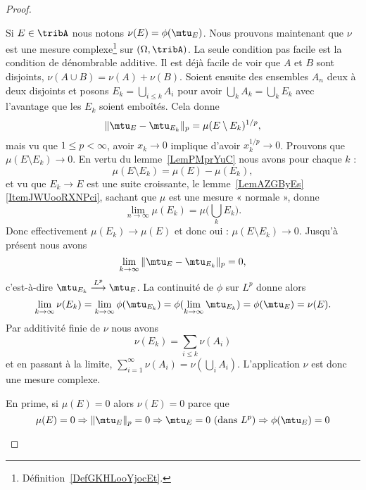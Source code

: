 \begin{proof}
\begin{subproof}
    Si \( E\in\tribA\) nous notons \( \nu(E)=\phi(\mtu_E)\). Nous prouvons maintenant que \( \nu\) est une mesure complexe\footnote{Définition~\ref{DefGKHLooYjocEt}.} sur \( (\Omega,\tribA)\). La seule condition pas facile est la condition de dénombrable additive. Il est déjà facile de voir que \( A\) et \( B\) sont disjoints, \( \nu(A\cup B)=\nu(A)+\nu(B)\). Soient ensuite des ensembles \( A_n\) deux à deux disjoints et posons \( E_k=\bigcup_{i\leq k}A_i\) pour avoir \( \bigcup_kA_k=\bigcup_kE_k\) avec l'avantage que les \( E_k\) soient emboîtés. Cela donne
    \begin{equation}
        \| \mtu_E-\mtu_{E_k} \|_p=\mu(E\setminus E_k)^{1/p},
    \end{equation}
    mais vu que \( 1\leq p<\infty\), avoir \( x_k\to 0\) implique d'avoir \( x_k^{1/p}\to 0\). Prouvons que \( \mu(E\setminus E_k)\to 0\). En vertu du lemme~\ref{LemPMprYuC} nous avons pour chaque \( k\) :
    \begin{equation}
        \mu(E\setminus E_k)=\mu(E)-\mu(E_k),
    \end{equation}
    et vu que \( E_k\to E\) est une suite croissante, le lemme~\ref{LemAZGByEs}\ref{ItemJWUooRXNPci}, sachant que \( \mu\) est une mesure « normale », donne
    \begin{equation}
        \lim_{n\to \infty} \mu(E_k)=\mu\big( \bigcup_kE_k \big).
    \end{equation}
    Donc effectivement \( \mu(E_k)\to \mu(E)\) et donc oui : \( \mu(E\setminus E_k)\to 0\). Jusqu'à présent nous avons
    \begin{equation}
        \lim_{k\to \infty} \| \mtu_E-\mtu_{E_k} \|_p=0,
    \end{equation}
    c'est-à-dire \( \mtu_{E_k}\stackrel{L^p}{\longrightarrow}\mtu_E\). La continuité de \( \phi\) sur \( L^p\) donne alors
    \begin{equation}
        \lim_{k\to \infty} \nu(E_k)=\lim_{k\to \infty} \phi(\mtu_{E_k})=\phi(\lim_{k\to \infty} \mtu_{E_k})=\phi(\mtu_E)=\nu(E).
    \end{equation}
    Par additivité finie de \( \nu\) nous avons
    \begin{equation}
        \nu(E_k)=\sum_{i\leq k}\nu(A_i)
    \end{equation}
    et en passant à la limite, \( \sum_{i=1}^{\infty}\nu(A_i)=\nu(\bigcup_{i}A_i)\). L'application \( \nu\) est donc une mesure complexe.


    En prime, si \( \mu(E)=0\) alors \( \nu(E)=0\) parce que
    \begin{equation}
        \mu(E)=0\Rightarrow \| \mtu_E \|_p=0\Rightarrow \mtu_E=0\text{ (dans } L^p\text{)}\Rightarrow\phi(\mtu_E)=0
    \end{equation}


\end{subproof}
\end{proof}
